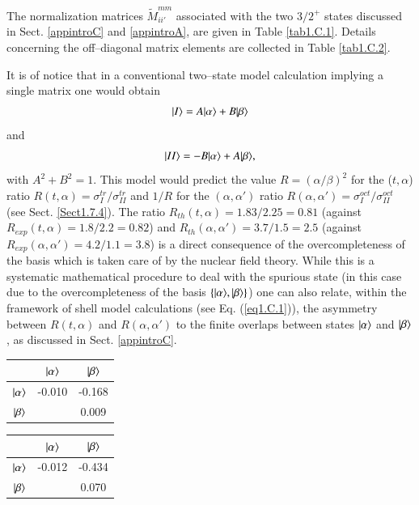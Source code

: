 \begin{subappendices}
 
 The normalization matrices $\tilde M_{ii'}^{mm}$ associated with the two $3/2^+$ states discussed in Sect. \ref{appintroC} and \ref{appintroA}, are given in Table \ref{tab1.C.1}. Details concerning the off--diagonal matrix elements are collected in Table \ref{tab1.C.2}.
 
 
 It is of notice that in a conventional two--state model calculation implying a single matrix one would obtain
 \begin{align}
\nonumber|{I} \rangle=A|{\alpha} \rangle+B|{\beta} \rangle
 \end{align}
and
 \begin{align}\label{eq1.C.6}
|{II} \rangle=-B|{\alpha} \rangle+A|{\beta} \rangle,
 \end{align}
with $A^2+B^2=1$. This model would predict the value $R=(\alpha/\beta)^2$ for the ($t,\alpha$) ratio $R(t,\alpha)=\sigma_I^{tr}/\sigma^{tr}_{II}$ and $1/R$ for the $(\alpha,\alpha')$ ratio   $R(\alpha,\alpha')=\sigma_I^{oct}/\sigma_{II}^{oct}$ (see Sect. \ref{Sect1.7.4}). The ratio $R_{th}(t,\alpha)=1.83/2.25=0.81$ (against $R_{exp}(t,\alpha)=1.8/2.2=0.82$) and $R_{th}(\alpha,\alpha')=3.7/1.5=2.5$ (against $R_{exp}(\alpha,\alpha')=4.2/1.1=3.8$) is a direct consequence of the overcompleteness of the basis which is taken care of by the nuclear field theory. While this is a systematic mathematical procedure to deal with the spurious state (in this case due to the overcompleteness of the basis $\left\{|{\alpha} \rangle,|{\beta} \rangle\right\}$) one can also relate, within the framework of shell model calculations (see Eq. (\ref{eq1.C.1})), the asymmetry between $R(t,\alpha)$ and $R(\alpha,\alpha')$ to the finite overlaps between states $|{\alpha} \rangle$ and $|{\beta} \rangle$, as discussed in Sect. \ref{appintroC}.
\begin{table}
\begin{tabular}{|c|c|c|}
 \hline 
  & $|{\alpha} \rangle$ & $|{\beta} \rangle$ \\
 \hline 
$|{\alpha} \rangle$ &-0.010 & -0.168    \\ 
 \hline
$|{\beta} \rangle$&  & 0.009 \\ 
 \hline
\end{tabular}
\begin{tabular}{|c|c|c|}
 \hline 
  & $|{\alpha} \rangle$ & $|{\beta} \rangle$ \\
 \hline 
$|{\alpha} \rangle$ &-0.012 & -0.434    \\ 
 \hline
$|{\beta} \rangle$&  & 0.070 \\ 
 \hline
\end{tabular}
\begin{tabular}{|c|c|c|}

\end{tabular}
\end{table}
\end{subappendices}
